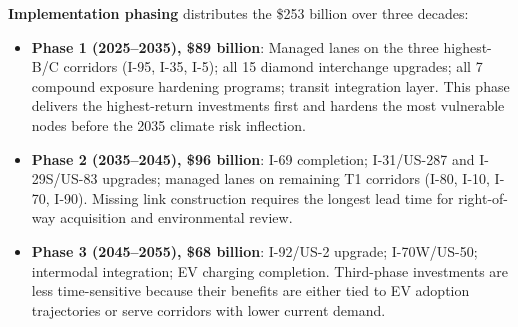 \textbf{Implementation phasing} distributes the \$253 billion over three decades:
\begin{itemize}
  \item \textbf{Phase 1 (2025--2035), \$89 billion}: Managed lanes on the three highest-B/C corridors (I-95, I-35, I-5); all 15 diamond interchange upgrades; all 7 compound exposure hardening programs; transit integration layer. This phase delivers the highest-return investments first and hardens the most vulnerable nodes before the 2035 climate risk inflection.
  \item \textbf{Phase 2 (2035--2045), \$96 billion}: I-69 completion; I-31/US-287 and I-29S/US-83 upgrades; managed lanes on remaining T1 corridors (I-80, I-10, I-70, I-90). Missing link construction requires the longest lead time for right-of-way acquisition and environmental review.
  \item \textbf{Phase 3 (2045--2055), \$68 billion}: I-92/US-2 upgrade; I-70W/US-50; intermodal integration; EV charging completion. Third-phase investments are less time-sensitive because their benefits are either tied to EV adoption trajectories or serve corridors with lower current demand.
\end{itemize}
